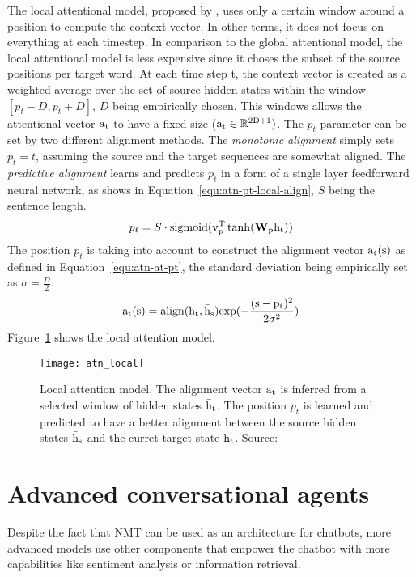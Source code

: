 The local attentional model, proposed by \citet{1508.04025}, uses only a certain window around a position to compute the context vector. In other terms, it does not focus on everything at each timestep. In comparison to the global attentional model, the local attentional model is less expensive since it choses the subset of the source positions per target word. At each time step t, the context vector is created as a weighted average over the set of source hidden states within the window $[p_t - D, p_t + D]$, $D$ being empirically chosen.
This windows allows the attentional vector $\rm{a}_t$ to have a fixed size ($\rm{a}_t \in \mathbb{R}^{2D+1})$. The $p_t$ parameter can be set by two different alignment methods. The \textit{monotonic alignment} simply sets $p_t = t$, assuming the source and the target sequences are somewhat aligned. The \textit{predictive alignment} learns and predicts $p_t$ in a form of a single layer feedforward neural network, as shows in Equation~\ref{equ:atn-pt-local-align}, $S$ being the sentence length.
\begin{equation}
    p_t = S \cdot \mathrm{sigmoid} ( \rm{v}_p^T \tanh ( \mathbf{W}_p \rm{h}_t))
    \label{equ:atn-pt-local-align}
\end{equation}
The position $p_t$ is taking into account to construct the alignment vector $\rm{a}_t(s)$ as defined in Equation~\ref{equ:atn-at-pt}, the standard deviation being empirically set as $\sigma = \frac{D}{2}$.
\begin{equation}
    \rm{a}_t(s) = \mathrm{align}(\rm{h}_t, \rm{\bar{h}}_s) \mathrm{exp}(- \frac{(s - p_t)^2}{2\sigma^2})
    \label{equ:atn-at-pt}
\end{equation}
Figure~\ref{fig:atn-local} shows the local attention model.
\begin{figure}
    \centering
    \texttt{[image: atn\_local]}
    \decoRule
    \caption[Local attention model]{Local attention model. The alignment vector $\rm{a}_t$ is inferred from a selected window of hidden states $\rm{\bar{h}}_t$. The position $p_t$ is learned and predicted to have a better alignment between the source hidden states $\rm{\bar{h}}_s$ and the curret target state $\rm{h}_t$. Source:~\citet{1508.04025}}
    \label{fig:atn-local}
\end{figure}

\section{Advanced conversational agents}
Despite the fact that NMT can be used as an architecture for chatbots, more advanced models use other components that empower the chatbot with more capabilities like sentiment analysis or information retrieval.

